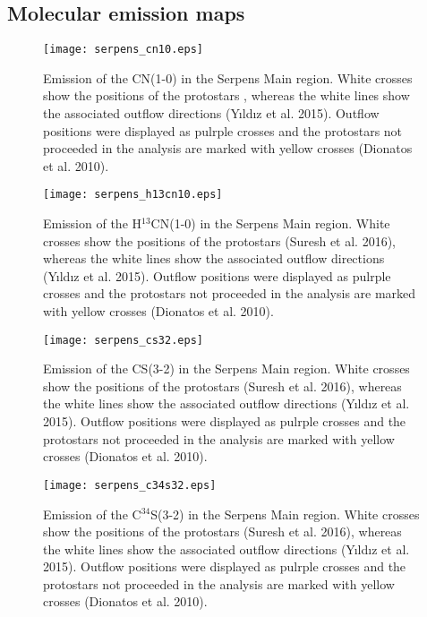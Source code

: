 \documentclass{aa}
\begin{document}
\begin{appendix} %
\section{Molecular emission maps}
\begin{figure}
\texttt{[image: serpens\_cn10.eps]}
\caption{Emission of the CN(1-0) in the Serpens Main region. White crosses show the positions of the protostars \citep{Sur16}, whereas the white lines show the associated outflow directions (Y{\i}ld{\i}z et al. 2015). Outflow positions were displayed as pulrple crosses and the protostars not proceeded in the analysis are marked with yellow crosses (Dionatos et al. 2010).}
\label{cn10}
\end{figure}

\begin{figure}
\texttt{[image: serpens\_h13cn10.eps]}
\caption{Emission of the H$^{13}$CN(1-0) in the Serpens Main region. White crosses show the positions of the protostars (Suresh et al. 2016), whereas the white lines show the associated outflow directions (Y{\i}ld{\i}z et al. 2015). Outflow positions were displayed as pulrple crosses and the protostars not proceeded in the analysis are marked with yellow crosses (Dionatos et al. 2010).}
\label{h13cn10}
\end{figure}

\begin{figure}
\texttt{[image: serpens\_cs32.eps]}
\caption{Emission of the CS(3-2) in the Serpens Main region. White crosses show the positions of the protostars (Suresh et al. 2016), whereas the white lines show the associated outflow directions (Y{\i}ld{\i}z et al. 2015). Outflow positions were displayed as pulrple crosses and the protostars not proceeded in the analysis are marked with yellow crosses (Dionatos et al. 2010).}
\label{cs32}
\end{figure}

\begin{figure}
\texttt{[image: serpens\_c34s32.eps]}
\caption{Emission of the C$^{34}$S(3-2) in the Serpens Main region. White crosses show the positions of the protostars (Suresh et al. 2016), whereas the white lines show the associated outflow directions (Y{\i}ld{\i}z et al. 2015). Outflow positions were displayed as pulrple crosses and the protostars not proceeded in the analysis are marked with yellow crosses (Dionatos et al. 2010).}
\label{c34s32}
\end{figure}

\end{appendix}
\end{document}
